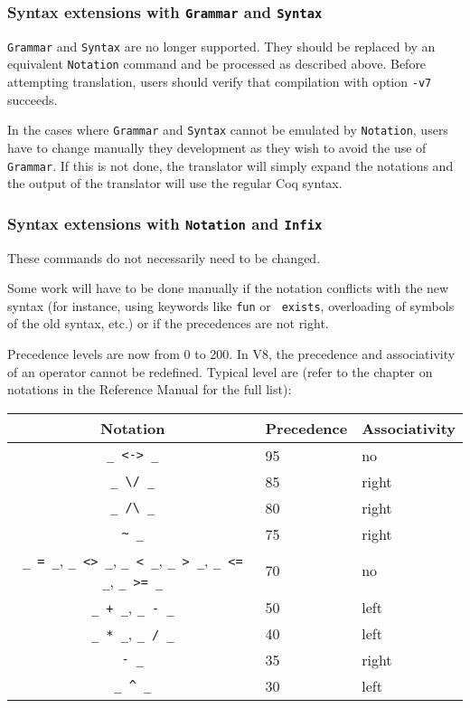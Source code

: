 \documentclass[11pt,a4paper]{article}
\begin{document}
\subsubsection{Syntax extensions with {\tt Grammar} and {\tt Syntax}}


{\tt Grammar} and {\tt Syntax} are no longer supported. They
should be replaced by an equivalent {\tt Notation} command and be
processed as described above. Before attempting translation, users
should verify that compilation with option {\tt -v7} succeeds.

In the cases where {\tt Grammar} and {\tt Syntax} cannot be emulated
by {\tt Notation}, users have to change manually they development as
they wish to avoid the use of {\tt Grammar}. If this is not done, the
translator will simply expand the notations and the output of the
translator will use the regular Coq syntax.

\subsubsection{Syntax extensions with {\tt Notation} and {\tt Infix}}

These commands do not necessarily need to be changed.

Some work will have to be done manually if the notation conflicts with
the new syntax (for instance, using keywords like {\tt fun} or {\tt
exists}, overloading of symbols of the old syntax, etc.) or if the
precedences are not right.

  Precedence levels are now from 0 to 200. In V8, the precedence and
associativity of an operator cannot be redefined. Typical level are
(refer to the chapter on notations in the Reference Manual for the
full list):

\begin{center}
\begin{tabular}{|cll|}
\hline
Notation & Precedence & Associativity \\
\hline
\verb!_ <-> _! & 95 & no \\
\verb!_ \/ _!  & 85 & right \\
\verb!_ /\ _!  & 80 & right \\
\verb!~ _!   & 75 & right \\
\verb!_ = _!, \verb!_ <> _!, \verb!_ < _!, \verb!_ > _!,
  \verb!_ <= _!, \verb!_ >= _!   & 70 & no \\
\verb!_ + _!, \verb!_ - _!   & 50 & left \\
\verb!_ * _!, \verb!_ / _!   & 40 & left \\
\verb!- _!  & 35 & right \\
\verb!_ ^ _!   & 30 & left \\
\hline
\end{tabular}
\end{center}
\end{document}
